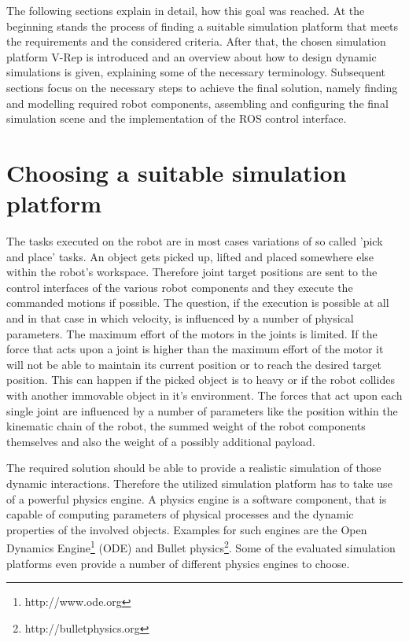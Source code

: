 The following sections explain in detail, how this goal was reached. At the beginning stands the process of finding a suitable simulation platform that meets the requirements and the considered criteria. After that, the chosen simulation platform V-Rep is introduced and an overview about how to design dynamic simulations is given, explaining some of the necessary terminology. Subsequent sections focus on the necessary steps to achieve the final solution, namely finding and modelling required robot components, assembling and configuring the final simulation scene and the implementation of the ROS control interface.

\section{Choosing a suitable simulation platform}

The tasks executed on the robot are in most cases variations of so called 'pick and place' tasks. An object gets picked up, lifted and placed somewhere else within the robot's workspace. Therefore joint target positions are sent to the control interfaces of the various robot components and they execute the commanded motions if possible. The question, if the execution is possible at all and in that case in which velocity, is influenced by a number of physical parameters. The maximum effort of the motors in the joints is limited. If the force that acts upon a joint is higher than the maximum effort of the motor it will not be able to maintain its current position or to reach the desired target position. This can happen if the picked object is to heavy or if the robot collides with another immovable object in it's environment. The forces that act upon each single joint are influenced by a number of parameters like the position within the kinematic chain of the robot, the summed weight of the robot components themselves and also the weight of a possibly additional payload.

The required solution should be able to provide a realistic simulation of those dynamic interactions. Therefore the utilized simulation platform has to take use of a powerful physics engine. A physics engine is a software component, that is capable of computing parameters of physical processes and the dynamic properties of the involved objects. Examples for such engines are the Open Dynamics Engine\footnote{http://www.ode.org} (ODE) and Bullet physics\footnote{http://bulletphysics.org}. Some of the evaluated simulation platforms even provide a number of different physics engines to choose.\\

